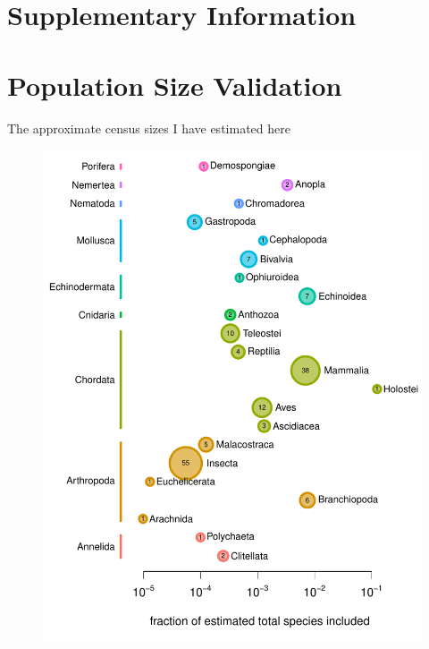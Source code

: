 \documentclass[11pt]{article}
\begin{document}
\printbibliography

\setcounter{table}{0}
\renewcommand{\thetable}{S\arabic{table}}
\setcounter{equation}{0}
\renewcommand{\theequation}{S\arabic{equation}}
\setcounter{section}{0}
\renewcommand{\thesection}{S\arabic{section}}
\setcounter{figure}{0}
\renewcommand{\thefigure}{S\arabic{figure}}

\section*{Supplementary Information}

\section{Population Size Validation}

The approximate census sizes I have estimated here


\begin{figure}[!htb]
  \centering
  \includegraphics[]{figures/species_counts.pdf}

  \caption{}

  \label{suppfig:species_counts}
\end{figure}
\end{document}
